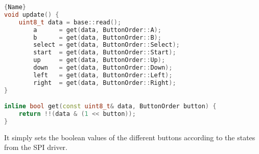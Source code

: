 \begin{lstlisting}[caption={Updating the state of the controller},label={lst:controller_update},frame=tlrb, language=C++]{Name}
void update() {
    uint8_t data = base::read();
		a      = get(data, ButtonOrder::A);
		b      = get(data, ButtonOrder::B);
		select = get(data, ButtonOrder::Select);
		start  = get(data, ButtonOrder::Start);
		up     = get(data, ButtonOrder::Up);
		down   = get(data, ButtonOrder::Down);
		left   = get(data, ButtonOrder::Left);
		right  = get(data, ButtonOrder::Right);
}

inline bool get(const uint8_t& data, ButtonOrder button) {
    return !!(data & (1 << button));
}
\end{lstlisting}

It simply sets the boolean values of the different buttons according to the states from the SPI driver.
